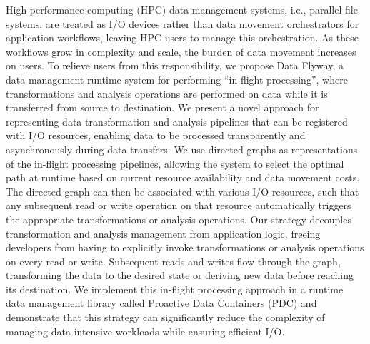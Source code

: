 High performance computing (HPC) data management systems, i.e., parallel file systems, are treated as I/O devices rather than data movement orchestrators for application workflows, leaving HPC users to manage this orchestration. As these workflows grow in complexity and scale, the burden of data movement increases on users. 
To relieve users from this responsibility, we propose Data Flyway, a data management runtime system for performing ``in-flight processing'', where transformations {\color{red}and analysis operations} are performed on data while it is transferred from source to destination. We present a novel approach for representing data transformation {\color{red}and analysis} pipelines that can be registered with I/O resources, enabling data to be processed transparently and asynchronously during data transfers. We use directed graphs as representations of the in-flight processing pipelines, allowing the system to select the optimal path at runtime based on current resource availability and data movement costs. The directed graph can then be associated with various I/O resources, such that any subsequent read or write operation on that resource automatically triggers the appropriate transformations {\color{red}or analysis operations}. Our strategy decouples transformation {\color{red}and analysis} management from application logic, freeing developers from having to explicitly invoke transformations {\color{red}or analysis operations} on every read or write. Subsequent reads and writes flow through the graph, transforming the data to the desired state {\color{red}or deriving new data} before reaching its destination. We implement this in-flight processing approach in a runtime data management library called Proactive Data Containers (PDC) and demonstrate that this strategy can significantly reduce the complexity of managing data-intensive workloads while ensuring efficient I/O.